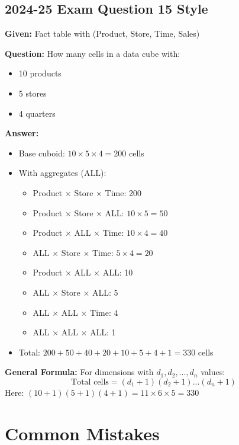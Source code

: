 \subsection{2024-25 Exam Question 15 Style}

\begin{examplebox}
\textbf{Given:} Fact table with (Product, Store, Time, Sales)

\textbf{Question:} How many cells in a data cube with:
\begin{itemize}
    \item 10 products
    \item 5 stores
    \item 4 quarters
\end{itemize}

\textbf{Answer:}
\begin{itemize}
    \item Base cuboid: $10 \times 5 \times 4 = 200$ cells
    \item With aggregates (ALL):
    \begin{itemize}
        \item Product × Store × Time: 200
        \item Product × Store × ALL: $10 \times 5 = 50$
        \item Product × ALL × Time: $10 \times 4 = 40$
        \item ALL × Store × Time: $5 \times 4 = 20$
        \item Product × ALL × ALL: 10
        \item ALL × Store × ALL: 5
        \item ALL × ALL × Time: 4
        \item ALL × ALL × ALL: 1
    \end{itemize}
    \item Total: $200 + 50 + 40 + 20 + 10 + 5 + 4 + 1 = 330$ cells
\end{itemize}

\textbf{General Formula:} For dimensions with $d_1, d_2, ..., d_n$ values:
\[
\text{Total cells} = (d_1 + 1)(d_2 + 1)...(d_n + 1)
\]
Here: $(10+1)(5+1)(4+1) = 11 \times 6 \times 5 = 330$
\end{examplebox}

\section{Common Mistakes}


